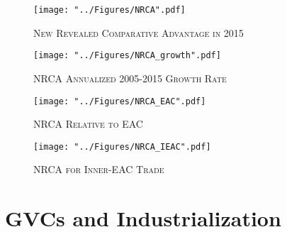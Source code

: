 \documentclass[compress]{beamer}
\begin{document}
\begin{frame}
\begin{figure}[h!]
\centering
\caption{\label{fig:NRCA}\textsc{New Revealed Comparative Advantage in 2015}}
\texttt{[image: "../Figures/NRCA".pdf]} %
\end{figure}
\end{frame}

\begin{frame}
\begin{figure}[h!]
\centering
\caption{\label{fig:NRCA_growth}\textsc{NRCA Annualized 2005-2015 Growth Rate}}
\texttt{[image: "../Figures/NRCA\_growth".pdf]} %
\end{figure}
\end{frame}

\begin{frame}
\begin{figure}[h!]
\centering
\caption{\label{fig:NRCA_EAC}\textsc{NRCA Relative to EAC}}
\texttt{[image: "../Figures/NRCA\_EAC".pdf]} %
\end{figure}
\end{frame}

\begin{frame}
\begin{figure}[h!]
\centering
\caption{\label{fig:NRCA_IEAC}\textsc{NRCA for Inner-EAC Trade}}
\texttt{[image: "../Figures/NRCA\_IEAC".pdf]} %
\end{figure}
\end{frame}

\section{GVCs and Industrialization}
\end{document}
